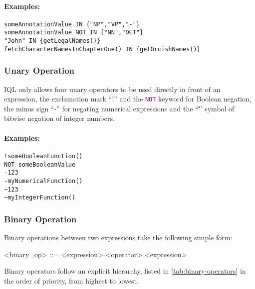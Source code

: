 \documentclass[11pt,a4paper,portrait]{article}
\newcommand{\iql}{IQL\xspace}
\newcommand{\keyword}[1]{\textcolor{purple}{\texttt{#1}}}
\begin{document}
\paragraph{Examples:}

\begin{verbatim}
someAnnotationValue IN {"NP","VP","-"}
someAnnotationValue NOT IN {"NN","DET"}
"John" IN {getLegalNames()}
fetchCharacterNamesInChapterOne() IN {getOrcishNames()}
\end{verbatim}

\subsubsection{Unary Operation}
\label{sec:unary-operation}

\iql only allows four unary operators to be used directly in front of an expression, the exclamation mark ``!'' and the \keyword{NOT} keyword for Boolean negation, the minus sign ``-'' for negating numerical expressions and the ``\~'' symbol of bitwise negation of integer numbers.

\paragraph{Examples:}

\begin{verbatim}
!someBooleanFunction()
NOT someBooleanValue
-123
-myNumericalFunction()
~123
~myIntegerFunction()
\end{verbatim}

\subsubsection{Binary Operation}
\label{sec:binary-operation}

Binary operations between two expressions take the following simple form:

\begin{grammar}	
	<binary_op> ::= <expression> <operator> <expression>
\end{grammar}

\noindent Binary operators follow an explicit hierarchy, listed in \cref{tab:binary-operators} in the order of priority, from highest to lowest.
\end{document}
